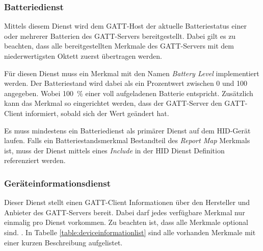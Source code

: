 \subsubsection{Batteriedienst}
Mittels diesem Dienst wird dem \acs{GATT}-Host der aktuelle Batteriestatus einer oder mehrerer Batterien des \acs{GATT}-Servers bereitgestellt. Dabei gilt es zu beachten, dass alle bereitgestellten Merkmale des \acs{GATT}-Servers mit dem niederwertigsten Oktett zuerst übertragen werden. \cite[S.~6]{bluetoothBatteryS}

Für diesen Dienst muss ein Merkmal mit den Namen \textit{Battery Level} implementiert werden. Der Batteriestand wird dabei als ein Prozentwert zwischen 0 und 100 angegeben. Wobei 100~\% einer voll aufgeladenen Batterie entspricht. Zusätzlich kann das Merkmal so eingerichtet werden, dass der \acs{GATT}-Server den \acs{GATT}-Client informiert, sobald sich der Wert geändert hat. \cite[S.~8]{bluetoothBatteryS}

Es muss mindestens ein Batteriedienst als primärer Dienst auf dem \acs{HID}-Gerät laufen. Falls ein Batteriestandsmerkmal Bestandteil des \textit{Report Map} Merkmals ist, muss der Dienst mittels eines \textit{Include} in der \acs{HID} Dienst Definition referenziert werden. \cite[S.~14]{bluetoothHOGP}

\subsubsection{Geräteinformationsdienst}
Dieser Dienst stellt einen \acs{GATT}-Client Informationen über den Hersteller und Anbieter des \acs{GATT}-Servers bereit. Dabei darf jedes verfügbare Merkmal nur einmalig pro Dienst vorkommen. Zu beachten ist, dass alle Merkmale optional sind. \cite[S.~6ff.]{bluetoothDeviceI}. In Tabelle \ref{table:deviceinformationlist} sind alle vorhanden Merkmale mit einer kurzen Beschreibung aufgelistet.

